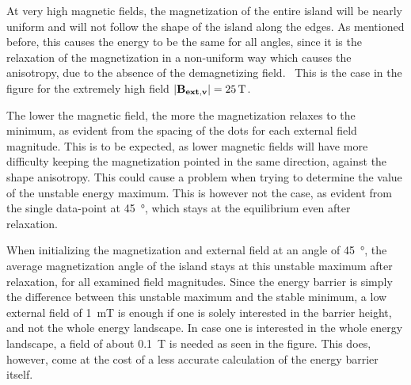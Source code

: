 \documentclass[12pt,a4paper]{article}
\begin{document}
At very high magnetic fields, the magnetization of the entire island will be nearly uniform and will not follow the shape of the island along the edges. As mentioned before, this causes the energy to be the same for all angles, since it is the relaxation of the magnetization in a non-uniform way which causes the anisotropy, due to the absence of the demagnetizing field.~\cite{Nonmonotonic_reversal} This is the case in the figure for the extremely high field $\abs{\vb{B_{ext,v}}}=\SI{25}{\tesla}$. \par
The lower the magnetic field, the more the magnetization relaxes to the minimum, as evident from the spacing of the dots for each external field magnitude. This is to be expected, as lower magnetic fields will have more difficulty keeping the magnetization pointed in the same direction, against the shape anisotropy. This could cause a problem when trying to determine the value of the unstable energy maximum. This is however not the case, as evident from the single data-point at \SI{45}{\degree}, which stays at the equilibrium even after relaxation. \par
When initializing the magnetization and external field at an angle of \SI{45}{\degree}, the average magnetization angle of the island stays at this unstable maximum after relaxation, for all examined field magnitudes. Since the energy barrier is simply the difference between this unstable maximum and the stable minimum, a low external field of \SI{1}{\milli\tesla} is enough if one is solely interested in the barrier height, and not the whole energy landscape. In case one is interested in the whole energy landscape, a field of about \SI{0.1}{\tesla} is needed as seen in the figure. This does, however, come at the cost of a less accurate calculation of the energy barrier itself. \par
\end{document}
